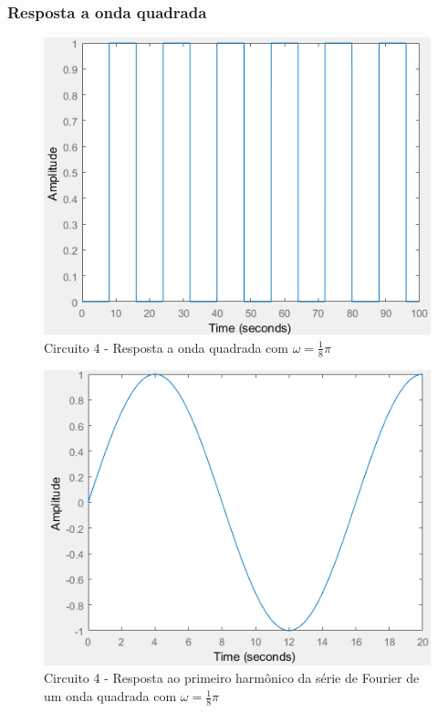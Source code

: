 \documentclass[a4paper, 12pt]{article}
\begin{document}
			\subsubsection{Resposta a onda quadrada}
			\begin{figure}[!ht]
				\centering
				\includegraphics[scale=0.71]{img/1i_circ4.png}
				\caption{Circuito 4 - Resposta a onda quadrada com $\omega = \frac{1}{8}\pi$}
			\end{figure}
			\begin{figure}[!ht]
				\centering
				\includegraphics[scale=0.71]{img/1j_circ4.png}
				\caption{Circuito 4 - Resposta ao primeiro harmônico da série de Fourier de um onda quadrada com $\omega = \frac{1}{8}\pi$}
			\end{figure}
\end{document}
